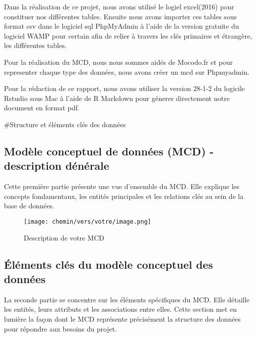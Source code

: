 \documentclass[
]{article}
\begin{document}
\bigskip

\begin{flushleft}
Dans la réalisation de ce projet, nous avons utilisé le logiel excel(2016) pour constituer nos différentes tables. Ensuite nous avons importer ces tables sous format csv dans le logiciel sql PhpMyAdmin à l'aide de la version gratuite du logiciel WAMP pour certain afin de relier à travers les clés primaires et étrangère, les différentes tables.  

Pour la réalisation du MCD, nous nous sommes aidés de Mocodo.fr et pour representer chaque type des données, nous avons créer un mcd sur Phpmyadmin.

Pour la rédaction de ce rapport, nous avons utiliser la version 28-1-2 du  logicile Rstudio sous Mac à l'aide de R Markdown pour génerer directement notre document en format pdf. 
\end{flushleft}

\#Structure et éléments clés des données

\hypertarget{moduxe8le-conceptuel-de-donnuxe9es-mcd---description-duxe9nuxe9rale}{%
\subsection{Modèle conceptuel de données (MCD) - description
dénérale}\label{moduxe8le-conceptuel-de-donnuxe9es-mcd---description-duxe9nuxe9rale}}

\begin{flushleft}
Cette première partie présente une vue d'ensemble du MCD. Elle explique les concepts fondamentaux, les entités principales et les relations clés au sein de la base de données.
\end{flushleft}

\begin{figure}[h]
    \centering
    \texttt{[image: chemin/vers/votre/image.png]}
    \caption{Description de votre MCD}
    \label{fig:mcd}
\end{figure}

\hypertarget{uxe9luxe9ments-cluxe9s-du-moduxe8le-conceptuel-des-donnuxe9es}{%
\subsection{Éléments clés du modèle conceptuel des
données}\label{uxe9luxe9ments-cluxe9s-du-moduxe8le-conceptuel-des-donnuxe9es}}

\begin{flushleft}
La seconde partie se concentre sur les éléments spécifiques du MCD. Elle détaille les entités, leurs attributs et les associations entre elles. Cette section met en lumière la façon dont le MCD représente précisément la structure des données pour répondre aux besoins du projet.
\end{flushleft}
\end{document}
